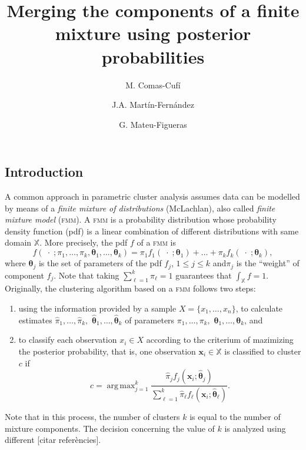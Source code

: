 \documentclass[10pt, a4paper]{article}
\title{Merging the components of a finite mixture using  posterior probabilities}
\author{M. Comas-Cufí \and J.A. Martín-Fernández \and G. Mateu-Figueras}
\DeclareMathOperator*{\argmax}{arg\,max}
\newcommand{\m}[1]{\boldsymbol{#1}}
\newcommand{\fmm}{\textsc{fmm}\xspace}
\begin{document}
\begin{spacing}{1.9}



\maketitle

\section{Introduction}


A common approach in parametric cluster analysis assumes data can be modelled by means of a \emph{finite mixture of distributions} (McLachlan), also called \emph{finite mixture model} (\fmm). A \fmm is a probability distribution whose probability density function (pdf) is a linear combination of different distributions with same domain $\mathbb{X}$. More precisely, the pdf $f$ of a \fmm is
\begin{equation}\label{mixt}
f(\;\cdot\; ; \pi_1, \dots, \pi_k, \m\theta_1, \dots, \m\theta_k) = \pi_1 f_1(\;\cdot\; ; \m\theta_1) + \dots + \pi_k f_k(\;\cdot\; ; \m\theta_k),
\end{equation}
where $\m\theta_j$ is the set of parameters of the pdf $f_j$, $1\leq j \leq k$ and$\pi_j$ is the ``weight'' of component $f_j$. Note that taking $\sum_{\ell = 1}^k \pi_\ell = 1$ guarantees that  $\int_{\mathbb{X}}f = 1$. Originally, the clustering algorithm based on a \fmm follows two steps:
\begin{enumerate}
\item using the information provided by a sample $X= \{x_1, \dots, x_n\}$, to calculate estimates $\hat{\pi}_1, \dots, \hat{\pi}_k,$ $\hat{\m\theta}_1, \dots, \hat{\m\theta}_k$ of parameters $\pi_1, \dots, \pi_k,$ $\m\theta_1, \dots, \m\theta_k$, and
\item to classify each observation $x_i \in X$ according to the criterium of mazimizing the posterior probability, that is, one observation $\m x_i \in \mathbb{X}$ is classified to cluster $c$ if
\begin{equation}\label{map_criteria}
c=\argmax_{j=1}^k \frac{ \hat{\pi}_j f_j(\m x_i ; \hat{\m\theta}_j) }{\sum_{\ell=1}^k \hat{\pi}_\ell f_\ell(\m x_i ; \hat{\m\theta}_\ell) }.
\end{equation}
\end{enumerate}
Note that in this process, the number of clusters $k$ is equal to the number of mixture components. The decision concerning the value of $k$ is analyzed using different [citar referències].


\end{spacing}
\end{document}
